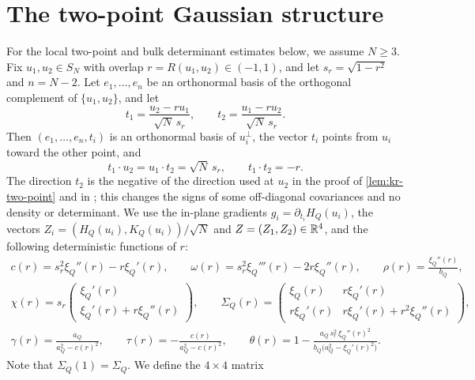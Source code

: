 \section{The two-point Gaussian structure}\label{sec:mp-gaussian}

For the local two-point and bulk determinant estimates below, we assume $N\ge3$. Fix $u_1,u_2\in S_N$ with overlap $r=R(u_1,u_2)\in(-1,1)$, and let $s_r=\sqrt{1-r^2}$ and $n=N-2$. Let $e_1,\dots,e_n$ be an orthonormal basis of the orthogonal complement of $\{u_1,u_2\}$, and let
\begin{equation}\label{eq:mp-frame}
t_1=\frac{u_2-ru_1}{\sqrt N\,s_r},\qquad t_2=\frac{u_1-ru_2}{\sqrt N\,s_r}.
\end{equation}
Then $(e_1,\dots,e_n,t_i)$ is an orthonormal basis of $u_i^\perp$, the vector $t_i$ points from $u_i$ toward the other point, and
\begin{equation}\label{eq:mp-frame-products}
t_1\cdot u_2=u_1\cdot t_2=\sqrt N\,s_r,\qquad t_1\cdot t_2=-r.
\end{equation}
The direction $t_2$ is the negative of the direction used at $u_2$ in the proof of \cref{lem:kr-two-point} and in \cite{BenArousSubagZeitouni2020}; this changes the signs of some off-diagonal covariances and no density or determinant. We use the in-plane gradients $g_i=\partial_{t_i}H_Q(u_i)$, the vectors $Z_i=(H_Q(u_i),K_Q(u_i))/\sqrt N$ and $Z=(Z_1,Z_2)\in\mathbb R^4$, and the following deterministic functions of $r$:
\begin{equation}\label{eq:mp-functions}
\begin{gathered}
c(r)=s_r^2\xi_Q''(r)-r\xi_Q'(r),\qquad \omega(r)=s_r^2\xi_Q'''(r)-2r\xi_Q''(r),\qquad \rho(r)=\frac{\xi_Q''(r)}{b_Q},\\
\chi(r)=s_r\begin{pmatrix}\xi_Q'(r)\\ \xi_Q'(r)+r\xi_Q''(r)\end{pmatrix},\qquad
\Sigma_Q(r)=\begin{pmatrix}\xi_Q(r)&r\xi_Q'(r)\\ r\xi_Q'(r)&r\xi_Q'(r)+r^2\xi_Q''(r)\end{pmatrix},\\
\gamma(r)=\frac{a_Q}{a_Q^2-c(r)^2},\qquad \tau(r)=-\frac{c(r)}{a_Q^2-c(r)^2},\qquad
\theta(r)=1-\frac{a_Q\,s_r^2\,\xi_Q''(r)^2}{b_Q\bigl(a_Q^2-\xi_Q'(r)^2\bigr)}.
\end{gathered}
\end{equation}
Note that $\Sigma_Q(1)=\Sigma_Q$. We define the $4\times4$ matrix
